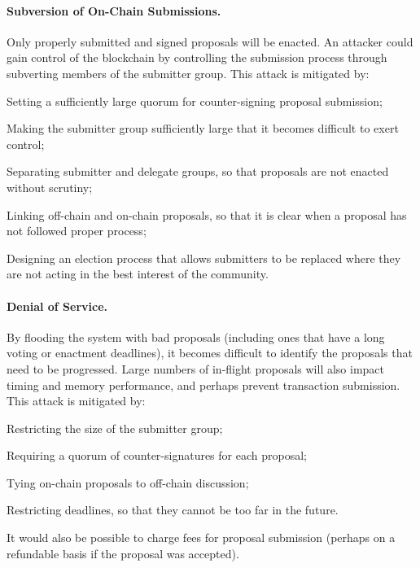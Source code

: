 \paragraph{Subversion of On-Chain Submissions.}
Only properly submitted and signed proposals will be enacted.  An attacker could gain control of the blockchain by controlling the submission process through
subverting members of the submitter group.
%
This attack is mitigated by:
  \begin{inparaenum}
  \item
    Setting a sufficiently large quorum for counter-signing proposal submission;
  \item
    Making the submitter group sufficiently large that it becomes difficult to exert control;
  \item
    Separating submitter and delegate groups, so that proposals are not enacted without scrutiny;
  \item
    Linking off-chain and on-chain proposals, so that it is clear when a proposal has not followed proper process;
  \item
    Designing an election process that allows submitters to be replaced where they are not acting in the best interest of the community.
  \end{inparaenum}


\paragraph{Denial of Service.}
By flooding the system with bad proposals (including ones that have a long voting or enactment deadlines), it becomes difficult to identify the
proposals that need to be progressed.  Large numbers of in-flight proposals will also impact timing and memory performance, and perhaps prevent transaction submission.
%
This attack is mitigated by:
  \begin{inparaenum}
  \item
    Restricting the size of the submitter group;
  \item
    Requiring a quorum of counter-signatures for each proposal;
  \item
    Tying on-chain proposals to off-chain discussion;
  \item
    Restricting deadlines, so that they cannot be too far in the future.
  \end{inparaenum}
It would also be possible to charge fees for proposal submission (perhaps on a refundable basis if the proposal was accepted).

